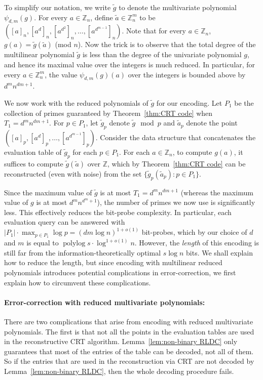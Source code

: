 \documentclass[11pt,english]{article}
\theoremstyle{definition}
\theoremstyle{remark}
\newcommand{\Z}{\mathbb{Z}}
\newcommand{\polylog}{\operatorname{polylog} }
\begin{document}
To simplify our notation, we write $\tilde{g}$ to denote the multivariate
polynomial $\psi_{d,m}(g)$. For every $a\in\Z_{n}$, define $\tilde{a}\in\Z_{n}^{m}$
to be $([a]_{n},[a^{d}]_{n},[a^{d^{2}}]_{n},\ldots,[a^{d^{m-1}}]_{n})$.
Note that for every $a\in\Z_{n}$, $g(a)=\tilde{g}(\tilde{a})$ (mod $n$). Now
the trick is to observe that the total degree of the multilinear polynomial
$\tilde{g}$ is less than the degree of the univariate polynomial $g$,
and hence its maximal value over the integers is much reduced.
In particular, for every $a\in\Z_{n}^{m}$, the value $\psi_{d,m}(g)(a)$
over the integers is bounded above by $d^{m}n^{dm+1}$.

We now work with the reduced polynomials of $\tilde{g}$ for our encoding.
Let $P_{1}$ be the collection of primes guaranteed by Theorem~\ref{thm:CRT code}
when $T_{1}=d^{m}n^{dm+1}$. For $p\in P_{1}$, let $\tilde{g}_{p}$
denote $\tilde{g}\mod p$ and $\tilde{a}_{p}$ denote the point $([a]_{p},[a^{d}]_{p},\ldots,[a^{d^{m-1}}]_{p})$.
Consider the data structure that concatenates the evaluation table
of $\tilde{g}_{p}$ for each $p\in P_{1}$. For each $a\in\Z_{n}$,
to compute $g(a)$, it suffices to compute $\tilde{g}(\tilde{a})$
over $\Z$, which by Theorem~\ref{thm:CRT code} can be reconstructed
(even with noise) from the set $\{\tilde{g}_{p}(\tilde{a}_{p}):p\in P_{1}\}$. 

Since the maximum value of $\tilde{g}$ is at most $T_{1}=d^{m}n^{dm+1}$
(whereas the maximum value of $g$ is at most $d^{m}n^{d^{m}+1}$),
the number of primes we now use is significantly less. This effectively
reduces the bit-probe complexity. In particular, each evaluation query
can be answered with $|P_{1}|\cdot\max_{p\in P_{1}}\log p=(dm\log n)^{1+o(1)}$
bit-probes, which by our choice of $d$ and $m$ is equal to $\polylog s\cdot\log^{1+o(1)}n$.
However, the \emph{length} of this encoding is still far from the information-theoretically
optimal $s\log n$ bits. We shall explain how to reduce the length,
but since encoding with multilinear reduced polynomials introduces
potential complications in error-correction, we first explain how
to circumvent these complications.

\paragraph{\textbf{Error-correction with reduced multivariate polynomials:}}

There are two complications that arise from encoding with reduced
multivariate polynomials. The first is that not all the points in
the evaluation tables are used in the reconstructive CRT algorithm.
Lemma~\ref{lem:non-binary RLDC} only guarantees that most of the
entries of the table can be decoded, not all of them. So if the entries
that are used in the reconstruction via CRT are not decoded by Lemma~\ref{lem:non-binary RLDC},
then the whole decoding procedure fails. 
\end{document}
